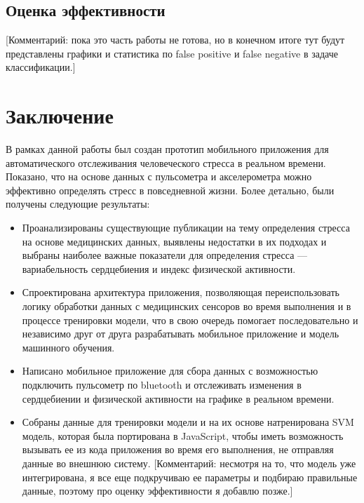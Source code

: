 \documentclass[14pt]{matmex-diploma-custom}
\begin{document}
\subsection{Оценка эффективности}
[Комментарий: пока это часть работы не готова, но в конечном итоге тут будут
представлены графики и статистика по false positive и false negative в задаче
классификации.]

\section*{Заключение}
В рамках данной работы был создан прототип мобильного приложения для
автоматического отслеживания человеческого стресса в реальном времени. Показано,
что на основе данных с пульсометра и акселерометра можно эффективно определять
стресс в повседневной жизни. Более детально, были получены следующие результаты:

\begin{itemize}
\item Проанализированы существующие публикации на тему определения стресса на
  основе медицинских данных, выявлены недостатки в их подходах и выбраны
  наиболее важные показатели для определения стресса — вариабельность
  сердцебиения и индекс физической активности.
\item Спроектирована архитектура приложения, позволяющая переиспользовать логику
  обработки данных с медицинских сенсоров во время выполнения и в процессе
  тренировки модели, что в свою очередь помогает последовательно и независимо
  друг от друга разрабатывать мобильное приложение и модель машинного обучения.
\item Написано мобильное приложение для сбора данных с возможностью подключить
  пульсометр по bluetooth и отслеживать изменения в сердцебиении и физической
  активности на графике в реальном времени.
\item Собраны данные для тренировки модели и на их основе натренирована SVM
  модель, которая была портирована в JavaScript, чтобы иметь возможность
  вызывать ее из кода приложения во время его выполнения, не отправляя данные во
  внешнюю систему. [Комментарий: несмотря на то, что модель уже интегрирована, я
  все еще подкручиваю ее параметры и подбираю правильные данные, поэтому про
  оценку эффективности я добавлю позже.]
\end{itemize}

\setmonofont[Path=assets/fonts/, UprightFont=*-Regular, BoldFont=*-Bold,
ItalicFont=*-Italic, BoldItalicFont=*-BoldItalic, Mapping=tex-text]{CMUTypewriterText}
 
\end{document}
